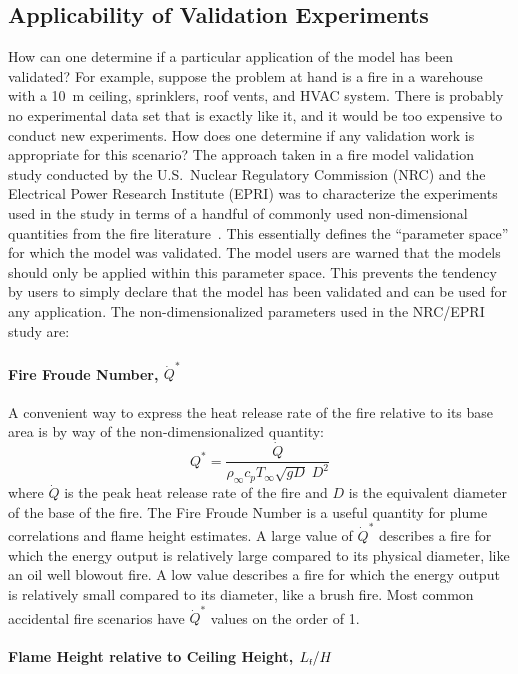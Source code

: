 \documentclass[graybox]{svmult}
\begin{document}
\subsection{Applicability of Validation Experiments}

How can one determine if a particular application of the model has been validated? For example, suppose the problem at hand is a fire in a warehouse with a 10~m ceiling, sprinklers, roof vents, and HVAC system. There is probably no experimental data set that is exactly like it, and it would be too expensive to conduct new experiments. How does one determine if any validation work is appropriate for this scenario? The approach taken in a fire model validation study conducted by the U.S.~Nuclear Regulatory Commission (NRC) and the Electrical Power Research Institute (EPRI) was to characterize the experiments used in the study in terms of a handful of commonly used non-dimensional quantities from the fire literature~\cite{Hill:2007}. This essentially defines the ``parameter space'' for which the model was validated. The model users are warned that the models should only be applied within this parameter space. This prevents the tendency by users to simply declare that the model has been validated and can be used for any application. The non-dimensionalized parameters used in the NRC/EPRI study are:

\paragraph{Fire Froude Number, $\dot{Q}^*$}

A convenient way to express the heat release rate of the fire relative to its base area is by way of the non-dimensionalized quantity:
\begin{equation}
 Q^* = \frac{\dot{Q}}{\rho_\infty c_p T_\infty \sqrt{gD} \; D^2}
\end{equation}
where $\dot{Q}$ is the peak heat release rate of the fire and $D$ is the equivalent diameter of the base of the fire.
The Fire Froude Number is a useful quantity for plume correlations and flame height estimates. A large value of $\dot{Q}^*$ describes a fire for which the energy output is relatively large compared to its physical diameter, like an oil well blowout fire.  A low value describes a fire for which the energy output is relatively small compared to its diameter, like a brush fire.  Most common accidental fire scenarios have $\dot{Q}^*$ values on the order of 1.

\paragraph{Flame Height relative to Ceiling Height, $L_{\hbox{\tiny f}}/H$}
\end{document}
